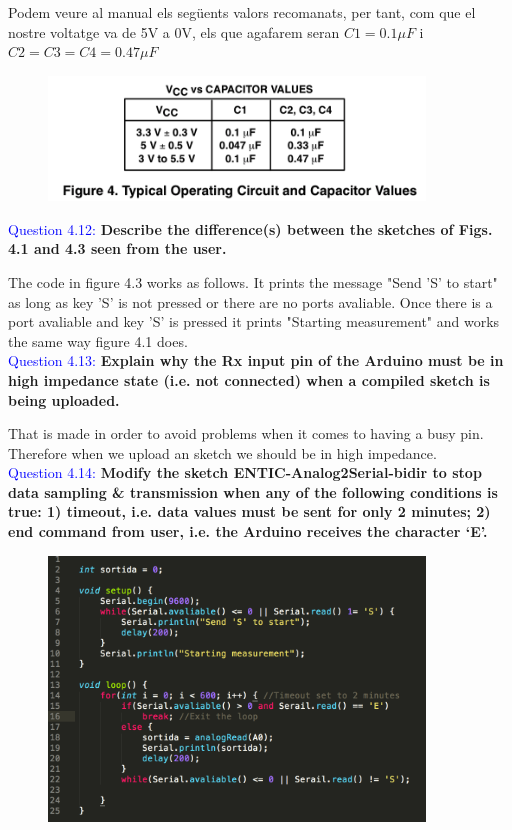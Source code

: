 \documentclass[12pt, a4papre]{article}
\begin{document}
	Podem veure al manual els següents valors recomanats, per tant, com que el nostre voltatge va de 5V a 0V, els que agafarem seran $C1 = 0.1\mu F$ i $C2 = C3= C4 = 0.47\mu F$
	
	\begin{figure}[H]
		\begin{center}
		\includegraphics[width=100mm]{CapMan.png}
		\end{center}
	\end{figure}

	\textcolor{blue}{Question 4.12:} \textbf{Describe the difference(s) between the sketches of Figs. 4.1 and 4.3 seen from the user.}
	
	The code in figure 4.3 works as follows. It prints the message "Send 'S' to start" as long as key 'S' is not pressed or there are no ports avaliable. Once there is a port avaliable and key 'S' is pressed it prints "Starting measurement" and works the same way figure 4.1 does.\\
	
	\textcolor{blue}{Question 4.13:} \textbf{Explain why the Rx input pin of the Arduino must be in high impedance state (i.e. not connected) when a compiled sketch is being uploaded. }
	
	That is made in order to avoid problems when it comes to having a busy pin. Therefore when we upload an sketch we should be in high impedance.\\

	\textcolor{blue}{Question 4.14:} \textbf{Modify the sketch ENTIC-Analog2Serial-bidir to stop data sampling \& transmission when any of the following conditions is true: 1) timeout, i.e. data values must be sent for only 2 minutes; 2) end command from user, i.e. the Arduino receives the character ‘E’.  }
	
	\begin{figure}[H]
		\begin{center}
		\includegraphics[width=100mm]{CodiCpp.png}
		\end{center}
	\end{figure}
\end{document}
